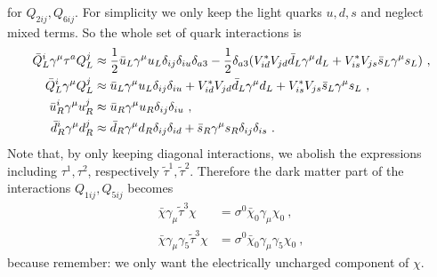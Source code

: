 for $Q_{2ij}, Q_{6ij}$. For simplicity we only keep the light quarks $u,d,s$ and neglect mixed terms. So the whole set of quark interactions is
\begin{align}
	\bar{Q}_L^i\gamma^\mu\tau^a Q_L^j &\approx \frac{1}{2}\bar{u}_L\gamma^\mu u_L\delta_{ij}\delta_{iu}\delta_{a3} - \frac{1}{2}\delta_{a3}(V_{id}^*V_{jd}\bar{d}_L\gamma^\mu d_L + V_{is}^*V_{js}\bar{s}_L\gamma^\mu s_L) \ , \notag \\
	\bar{Q}_L^i\gamma^\mu Q_L^j &\approx \bar{u}_L\gamma^\mu u_L\delta_{ij}\delta_{iu} + V_{id}^*V_{jd}\bar{d}_L\gamma^\mu d_L + V_{is}^*V_{js}\bar{s}_L\gamma^\mu s_L \ , \notag \\
	\bar{u}_R^i\gamma^\mu u_R^j &\approx\bar{u}_R\gamma^\mu u_R\delta_{ij}\delta_{iu} \ , \notag \\
	\bar{d}_R^i\gamma^\mu d_R^j &\approx \bar{d}_R\gamma^\mu d_R\delta_{ij}\delta_{id} + \bar{s}_R\gamma^\mu s_R\delta_{ij}\delta_{is} \ .
\end{align}
Note that, by only keeping diagonal interactions, we abolish the expressions including $\tau^1,\tau^2$, respectively $\tilde{\tau}^1,\tilde{\tau}^2$. Therefore the dark matter part of the interactions $Q_{1ij},Q_{5ij}$ becomes
\begin{align}
	\bar{\chi}\gamma_\mu\tilde{\tau}^3\chi &= \sigma^0\bar{\chi}_0\gamma_\mu\chi_0 \ , \\
	\bar{\chi}\gamma_\mu\gamma_5\tilde{\tau}^3\chi &= \sigma^0\bar{\chi}_0\gamma_\mu\gamma_5\chi_0 \ ,
\end{align}
because remember: we only want the electrically uncharged component of $\chi$.

